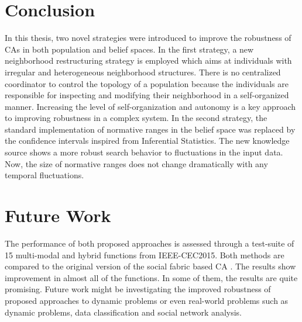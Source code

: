 \label{concl}
\section{Conclusion}
In this thesis, two novel strategies were introduced to improve the robustness of CAs in both population and belief spaces. In the first strategy, a new neighborhood restructuring strategy is employed which aims at individuals with irregular and heterogeneous neighborhood structures. There is no centralized coordinator to control the topology of a population because the individuals are responsible for inspecting and modifying their neighborhood in a self-organized manner. Increasing the level of self-organization and autonomy is a key approach to improving robustness in a complex system.  In the second strategy, the standard implementation of normative ranges in the belief space was replaced by the confidence intervals inspired from Inferential Statistics. The new knowledge source shows a more robust search behavior to fluctuations in the input data. Now, the size of normative ranges does not change dramatically with any temporal fluctuations.\newline

\section{Future Work}
The performance of both proposed approaches is assessed through a test-suite of 15 multi-modal and hybrid functions from IEEE-CEC2015. Both methods are compared to the original version of the social fabric based CA \cite{ali2016leveraged}. The results show improvement in almost all of the functions. In some of them, the results are quite promising. Future work might be investigating the improved robustness of proposed approaches to dynamic problems or even real-world problems such as dynamic problems, data classification and social network analysis.



